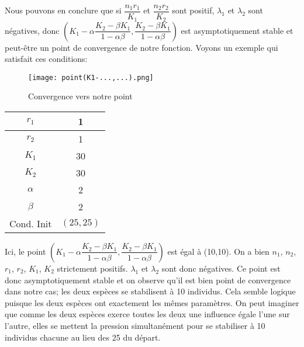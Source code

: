 \documentclass[11pt]{article}
\begin{document}
Nous pouvons en conclure que si $\dfrac{n_1r_1}{K_1}$ et $\dfrac{n_2r_2}{K_2}$ sont positif, $\lambda_1$ et $\lambda_2$ sont négatives, donc $(K_1 - \alpha \dfrac{K_2-\beta K_1}{1 -\alpha \beta},\dfrac{K_2-\beta K_1}{1 -\alpha \beta})$ est asymptotiquement stable et peut-être un point de convergence de notre fonction. Voyons un exemple qui satisfait ces conditions:
\begin{center}

\begin{figure}[H]
    \centering
    \texttt{[image: point(K1-...,...).png]}
    \caption{Convergence vers notre point}
    \label{1}
\end{figure}

\begin{tabular}{c|c}
     $r_1$&1  \\
     \hline
     $r_2$&1 \\
     \hline
     $K_1$&30 \\
     \hline
     $K_2$&30\\
     \hline
     $\alpha$&2\\
     \hline
     $\beta$&2\\
     \hline
     Cond. Init& $(25,25)$
\end{tabular}
\end{center}

Ici, le point $(K_1 - \alpha \dfrac{K_2-\beta K_1}{1 -\alpha \beta},\dfrac{K_2-\beta K_1}{1 -\alpha \beta})$ est égal à (10,10). On a bien $n_1$, $n_2$, $r_1$, $r_2$, $K_1$, $K_2$ strictement positifs. $\lambda_1$ et $\lambda_2$ sont donc négatives. Ce point est donc asymptotiquement stable et on observe qu'il est bien point de convergence dans notre cas; les deux espèces se stabilisent à 10 individus. Cela semble logique puisque les deux espèces ont exactement les mêmes paramètres. On peut imaginer que comme les deux espèces exerce toutes les deux une influence égale l'une sur l'autre, elles se mettent la pression simultanément pour se stabiliser à 10 individus chacune au lieu des 25 du départ.
\end{document}
